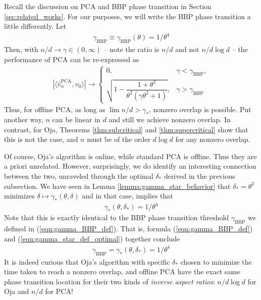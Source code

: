 \documentclass[12pt]{article}
\newcommand{\BBP}{\text{BBP}}
\newcommand{\PCA}{\text{PCA}}
\begin{document}
Recall the discussion on PCA and BBP phase transition in Section \ref{sec:related_works}. For our purposes, we will write the BBP phase transition a little differently. Let
\begin{align}\label{eqn:gamma_BBP_def}
  \gamma_\BBP\equiv\gamma_\BBP(\theta)=1/\theta^4  
\end{align}
 Then, with $n/d\to\gamma\in(0,\infty)$ -- note the ratio is $n/d$ and not $n/d\log d$ -- the performance of PCA can be re-expressed as
\begin{align*}
    |\langle \hat v_n^\PCA,v_0\rangle|\to \begin{cases}
        0, & \gamma < \gamma_{\text{BBP}}, \\
        \sqrt{1 - \dfrac{1+\theta^2}{\theta^2(\gamma\theta^2+1)}}, & \gamma > \gamma_{\text{BBP}}
    \end{cases}
\end{align*}Thus, for offline PCA, as long as $\lim n/d > \gamma_*$, nonzero overlap is possible. Put another way, $n$ can be linear in $d$ and still we achieve nonzero overlap. In contrast, for Oja, Theorems \ref{thm:subcritical} and \ref{thm:supercritical} show that this is not the case, and $n$ must be of the order $d\log d$ for any nonzero overlap.

 \medskip

Of course, Oja's algorithm is online, while standard PCA is offline. Thus they are a priori unrelated. However, surprisingly, we do identify an interesting connection between the two, unraveled through the optimal $\delta_*$ derived in the previous subsection. We have seen in Lemma \ref{lemma:gamma_star_behavior} that $\delta_*=\theta^2$ minimizes $\delta\mapsto \gamma_*(\theta,\delta)$ and in that case, implies that
\begin{align}\label{eqn:gamma_star_def_optimal}
   \gamma_*(\theta,\delta_*)=1/\theta^4 
\end{align}
Note that this is exactly identical to the BBP phase transition threshold $\gamma_\BBP$ we defined in (\ref{eqn:gamma_BBP_def}). That is, formula (\ref{eqn:gamma_BBP_def}) and (\ref{eqn:gamma_star_def_optimal}) together conclude
\begin{align*}
    \gamma_\BBP = \gamma_*(\theta,\delta_*) = 1/\theta^4
\end{align*}It is indeed curious that Oja's algorithm with specific $\delta_*$ chosen to minimize the time taken to reach a nonzero overlap, and offline PCA have the exact same phase transition location for their two kinds of \textit{inverse aspect ratios}: $n/d\log d$ for Oja and $n/d$ for PCA!
\end{document}
